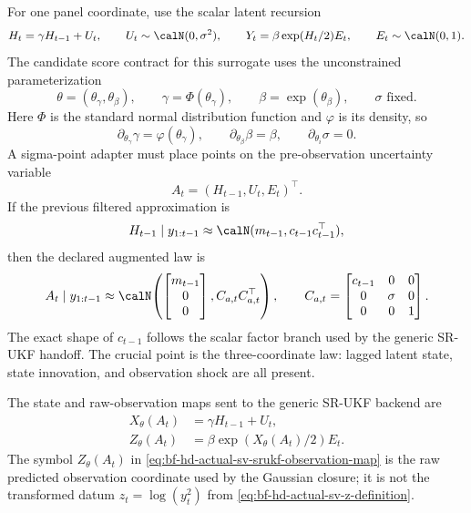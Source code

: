 For one panel coordinate, use the scalar latent recursion
\begin{equation}
  H_t=\gamma H_{t-1}+U_t,
  \qquad
  U_t\sim\calN(0,\sigma^2),
  \qquad
  Y_t=\beta \exp(H_t/2)E_t,
  \qquad
  E_t\sim\calN(0,1).
  \label{eq:bf-hd-actual-sv-srukf-model}
\end{equation}
The candidate score contract for this surrogate uses the unconstrained
parameterization
\begin{equation}
  \theta=(\theta_\gamma,\theta_\beta),
  \qquad
  \gamma=\Phi(\theta_\gamma),
  \qquad
  \beta=\exp(\theta_\beta),
  \qquad
  \sigma \text{ fixed}.
  \label{eq:bf-hd-actual-sv-srukf-parameterization}
\end{equation}
Here \(\Phi\) is the standard normal distribution function and
\(\varphi\) is its density, so
\begin{equation}
  \partial_{\theta_\gamma}\gamma=\varphi(\theta_\gamma),
  \qquad
  \partial_{\theta_\beta}\beta=\beta,
  \qquad
  \partial_{\theta_i}\sigma=0.
  \label{eq:bf-hd-actual-sv-srukf-parameter-derivatives}
\end{equation}
A sigma-point adapter must place points on the pre-observation uncertainty
variable
\begin{equation}
  A_t=(H_{t-1},U_t,E_t)^\top .
  \label{eq:bf-hd-actual-sv-srukf-augmented-variable}
\end{equation}
If the previous filtered approximation is
\[
  H_{t-1}\mid y_{1:t-1}\approx
  \calN(m_{t-1},c_{t-1}c_{t-1}^\top),
\]
then the declared augmented law is
\begin{equation}
  A_t\mid y_{1:t-1}
  \approx
  \calN\!\left(
    \begin{bmatrix}m_{t-1}\\0\\0\end{bmatrix},
    C_{a,t}C_{a,t}^\top
  \right),
  \qquad
  C_{a,t}
  =
  \begin{bmatrix}
    c_{t-1} & 0 & 0\\
    0 & \sigma & 0\\
    0 & 0 & 1
  \end{bmatrix}.
  \label{eq:bf-hd-actual-sv-srukf-augmented-law}
\end{equation}
The exact shape of \(c_{t-1}\) follows the scalar factor branch used by the
generic SR-UKF handoff.  The crucial point is the three-coordinate law:
lagged latent state, state innovation, and observation shock are all present.

The state and raw-observation maps sent to the generic SR-UKF backend are
\begin{align}
  X_\theta(A_t)
    &=
    \gamma H_{t-1}+U_t,
    \label{eq:bf-hd-actual-sv-srukf-transition-map}\\
  Z_\theta(A_t)
    &=
    \beta\exp(X_\theta(A_t)/2)E_t .
    \label{eq:bf-hd-actual-sv-srukf-observation-map}
\end{align}
The symbol \(Z_\theta(A_t)\) in
\eqref{eq:bf-hd-actual-sv-srukf-observation-map} is the raw predicted
observation coordinate used by the Gaussian closure; it is not the transformed
datum \(z_t=\log(y_t^2)\) from
\eqref{eq:bf-hd-actual-sv-z-definition}.

